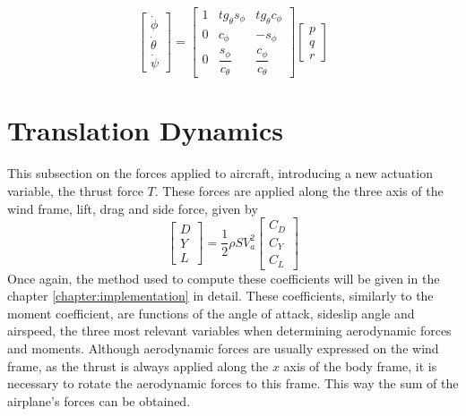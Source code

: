 \begin{equation}
\begin{bmatrix}
\dot{\phi}\\
\dot{\theta}\\
\dot{\psi}
\end{bmatrix}
=
\begin{bmatrix}
1 & tg_\theta s_\phi & tg_\theta c_\phi\\
0 & c_\phi & -s_\phi\\
0 & \dfrac{s_\phi}{c_\theta} & \dfrac{c_\phi}{c_\theta}
\end{bmatrix}
\begin{bmatrix}
p\\
q\\
r
\end{bmatrix}
\label{eq:euler2omega}
\end{equation}

\section{Translation Dynamics}
\label{section:background/model/guidance_dynamics}

This subsection on the forces applied to aircraft, introducing a new actuation variable, the thrust force $T$. These forces are applied along the three axis of the wind frame, lift, drag and side force, given by
\begin{equation}
\begin{bmatrix}
D\\
Y\\
L
\end{bmatrix}
= \dfrac{1}{2} \rho SV_a^2
\begin{bmatrix}
C_D\\
C_Y\\
C_L
\end{bmatrix}
\label{eq:forces}
\end{equation}
Once again, the method used to compute these coefficients will be given in the chapter \ref{chapter:implementation} in detail. These coefficients, similarly to the moment coefficient, are functions of the angle of attack, sideslip angle and airspeed, the three most relevant variables when determining aerodynamic forces and moments. Although aerodynamic forces are usually expressed on the wind frame, as the thrust is always applied along the $x$ axis of the body frame, it is necessary to rotate the aerodynamic forces to this frame. This way the sum of the airplane's forces can be obtained. 

